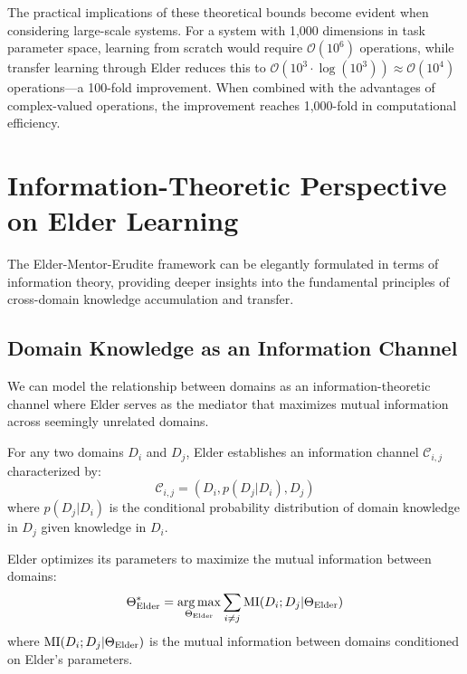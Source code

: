 The practical implications of these theoretical bounds become evident when considering large-scale systems. For a system with 1,000 dimensions in task parameter space, learning from scratch would require $\mathcal{O}(10^6)$ operations, while transfer learning through Elder reduces this to $\mathcal{O}(10^3 \cdot \log(10^3)) \approx \mathcal{O}(10^4)$ operations—a 100-fold improvement. When combined with the advantages of complex-valued operations, the improvement reaches 1,000-fold in computational efficiency.

\section{Information-Theoretic Perspective on Elder Learning}

The Elder-Mentor-Erudite framework can be elegantly formulated in terms of information theory, providing deeper insights into the fundamental principles of cross-domain knowledge accumulation and transfer.

\subsection{Domain Knowledge as an Information Channel}

We can model the relationship between domains as an information-theoretic channel where Elder serves as the mediator that maximizes mutual information across seemingly unrelated domains.

\begin{definition}
For any two domains $D_i$ and $D_j$, Elder establishes an information channel $\mathcal{C}_{i,j}$ characterized by:
\begin{equation}
\mathcal{C}_{i,j} = (D_i, p(D_j|D_i), D_j)
\end{equation}
where $p(D_j|D_i)$ is the conditional probability distribution of domain knowledge in $D_j$ given knowledge in $D_i$.
\end{definition}

\begin{theorem}
Elder optimizes its parameters to maximize the mutual information between domains:
\begin{equation}
\Theta_{\text{Elder}}^* = \mathop{\mathrm{arg\,max}}_{\Theta_{\text{Elder}}} \sum_{i \neq j} \text{MI}(D_i; D_j | \Theta_{\text{Elder}})
\end{equation}
where $\text{MI}(D_i; D_j | \Theta_{\text{Elder}})$ is the mutual information between domains conditioned on Elder's parameters.
\end{theorem}

